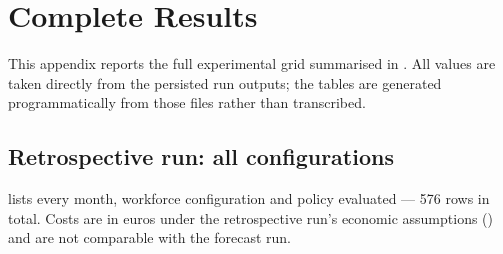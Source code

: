 \chapter{Complete Results}
\label{app:D}

This appendix reports the full experimental grid summarised in . All values are
taken directly from the persisted run outputs; the tables are generated programmatically from
those files rather than transcribed.

\section{Retrospective run: all configurations}

 lists every month, workforce configuration and policy evaluated --- 576 rows
in total. Costs are in euros under the retrospective run's economic assumptions
() and are not comparable with the forecast run.

